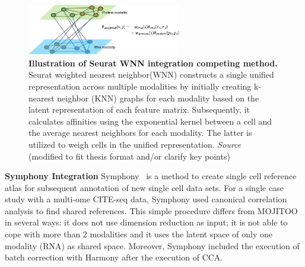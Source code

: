 \begin{description}
    \begin{figure}[!ht]
    	\centering
    	\includegraphics[width=0.60\textwidth]{Alg_WNN/fig}
    	\vspace{0.1cm}
    	\caption[Illustration of Seurat WNN integration competing method.]{\textbf{Illustration of Seurat WNN integration competing method.} Seurat weighted nearest neighbor(WNN) constructs a single unified representation across multiple modalities by initially creating k-nearest neighbor (KNN) graphs for each modality based on the latent representation of each feature matrix. Subsequently, it calculates affinities using the exponential kernel between a cell and the average nearest neighbors for each modality. The latter is utilized to weigh cells in the unified representation. \emph{Source ~\cite{hao2021seurat4}} (modified to fit thesis format and/or clarify key points)
    }
    	\label{fig:Alg_WNN}
    \end{figure}
    
    \item \textbf{Symphony Integration}
    Symphony~\cite{kang2021symphony} is a method to create single cell reference atlas for subsequent annotation of new single cell data sets. For a single case study with a multi-ome CITE-seq data, Symphony used canonical correlation analysis to find shared references. This simple procedure differs from MOJITOO in several ways: it does not use dimension reduction as input; it is not able to cope with more than 2 modalities and it uses the latent space of only one modality (RNA) as shared space.  Moreover, Symphony included the execution of batch correction with Harmony after the execution of CCA.

\end{description}


